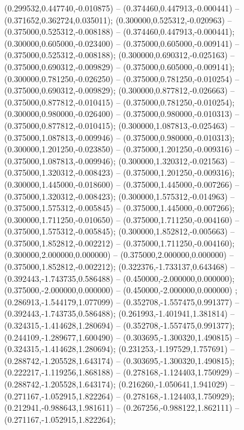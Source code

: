  (0.299532,0.447740,-0.010875) -- (0.374460,0.447913,-0.000441) -- (0.371652,0.362724,0.035011);
 (0.300000,0.525312,-0.020963) -- (0.375000,0.525312,-0.008188) -- (0.374460,0.447913,-0.000441);
 (0.300000,0.605000,-0.023400) -- (0.375000,0.605000,-0.009141) -- (0.375000,0.525312,-0.008188);
 (0.300000,0.690312,-0.025163) -- (0.375000,0.690312,-0.009829) -- (0.375000,0.605000,-0.009141);
 (0.300000,0.781250,-0.026250) -- (0.375000,0.781250,-0.010254) -- (0.375000,0.690312,-0.009829);
 (0.300000,0.877812,-0.026663) -- (0.375000,0.877812,-0.010415) -- (0.375000,0.781250,-0.010254);
 (0.300000,0.980000,-0.026400) -- (0.375000,0.980000,-0.010313) -- (0.375000,0.877812,-0.010415);
 (0.300000,1.087813,-0.025463) -- (0.375000,1.087813,-0.009946) -- (0.375000,0.980000,-0.010313);
 (0.300000,1.201250,-0.023850) -- (0.375000,1.201250,-0.009316) -- (0.375000,1.087813,-0.009946);
 (0.300000,1.320312,-0.021563) -- (0.375000,1.320312,-0.008423) -- (0.375000,1.201250,-0.009316);
 (0.300000,1.445000,-0.018600) -- (0.375000,1.445000,-0.007266) -- (0.375000,1.320312,-0.008423);
 (0.300000,1.575312,-0.014963) -- (0.375000,1.575312,-0.005845) -- (0.375000,1.445000,-0.007266);
 (0.300000,1.711250,-0.010650) -- (0.375000,1.711250,-0.004160) -- (0.375000,1.575312,-0.005845);
 (0.300000,1.852812,-0.005663) -- (0.375000,1.852812,-0.002212) -- (0.375000,1.711250,-0.004160);
 (0.300000,2.000000,0.000000) -- (0.375000,2.000000,0.000000) -- (0.375000,1.852812,-0.002212);
 (0.322376,-1.733137,0.643468) -- (0.392443,-1.743735,0.586488) -- (0.450000,-2.000000,0.000000);
 (0.375000,-2.000000,0.000000) -- (0.450000,-2.000000,0.000000) ;
 (0.286913,-1.544179,1.077099) -- (0.352708,-1.557475,0.991377) -- (0.392443,-1.743735,0.586488);
 (0.261993,-1.401941,1.381814) -- (0.324315,-1.414628,1.280694) -- (0.352708,-1.557475,0.991377);
 (0.244109,-1.289677,1.600490) -- (0.303695,-1.300320,1.490815) -- (0.324315,-1.414628,1.280694);
 (0.231253,-1.197529,1.757691) -- (0.288742,-1.205528,1.643174) -- (0.303695,-1.300320,1.490815);
 (0.222217,-1.119256,1.868188) -- (0.278168,-1.124403,1.750929) -- (0.288742,-1.205528,1.643174);
 (0.216260,-1.050641,1.941029) -- (0.271167,-1.052915,1.822264) -- (0.278168,-1.124403,1.750929);
 (0.212941,-0.988643,1.981611) -- (0.267256,-0.988122,1.862111) -- (0.271167,-1.052915,1.822264);
